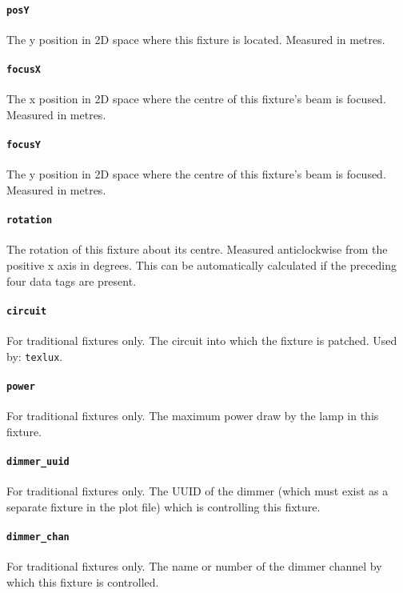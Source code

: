 \documentclass[a4paper]{article}
\begin{document}
\paragraph{\texttt{posY}}
The y position in 2D space where this fixture is located. Measured in metres.

\paragraph{\texttt{focusX}}
The x position in 2D space where the centre of this fixture's beam is 
focused. Measured in metres.

\paragraph{\texttt{focusY}}
The y position in 2D space where the centre of this fixture's beam is 
focused. Measured in metres.

\paragraph{\texttt{rotation}}
The rotation of this fixture about its centre. Measured anticlockwise from 
the positive x axis in degrees. This can be automatically calculated if the 
preceding four data tags are present.

\paragraph{\texttt{circuit}}
For traditional fixtures only. The circuit into which the fixture is patched. 
Used by: \texttt{texlux}.

\paragraph{\texttt{power}}
For traditional fixtures only. The maximum power draw by the lamp in this 
fixture.

\paragraph{\texttt{dimmer\_uuid}}
For traditional fixtures only. The UUID of the dimmer (which must exist as a 
separate fixture in the plot file) which is controlling this fixture.

\paragraph{\texttt{dimmer\_chan}}
For traditional fixtures only. The name or number of the dimmer channel by 
which this fixture is controlled. 
\end{document}
